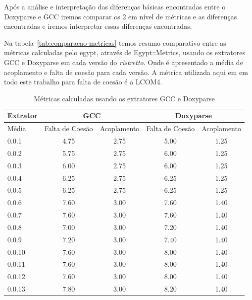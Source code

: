 Após a análise e interpretação das diferenças básicas encontradas entre o
Doxyparse e GCC iremos comparar os 2 em nível de métricas e as diferenças
encontradas e iremos interpretar essas diferenças encontradas.

Na tabela~\ref{tab:comparacao-metricas} temos resumo comparativo entre as
métricas calculadas pelo egypt, através de Egypt::Metrics, usando os extratores
GCC e Doxyparse em cada versão do {\it ristretto}. Onde é apresentado a média de
acoplamento e falta de coesão para cada versão. A métrica utilizada aqui em em
todo este trabalho para falta de coesão é a LCOM4.

\begin{table}
\caption{Métricas calculadas usando os extratores GCC e Doxyparse}
\centering
\begin{tabular}{| l | c c | c c |}
\hline
Extrator  & \multicolumn{2}{|c|}{GCC}        & \multicolumn{2}{|c|}{Doxyparse} \\
\hline
Média     & Falta de Coesão & Acoplamento    & Falta de Coesão & Acoplamento   \\
\hline
0.0.1     & 4.75            & 2.75           & 5.00            & 1.25          \\
0.0.2     & 5.75            & 2.75           & 6.00            & 1.25          \\
0.0.3     & 6.00            & 2.75           & 6.00            & 1.25          \\
0.0.4     & 6.25            & 2.75           & 6.25            & 1.25          \\
0.0.5     & 6.25            & 2.75           & 6.25            & 1.25          \\
0.0.6     & 7.60            & 3.00           & 7.60            & 1.40          \\
0.0.7     & 7.60            & 3.00           & 7.60            & 1.40          \\
0.0.8     & 7.00            & 3.00           & 7.20            & 1.40          \\
0.0.9     & 7.20            & 3.00           & 7.40            & 1.40          \\
0.0.10    & 7.60            & 3.00           & 8.00            & 1.40          \\
0.0.11    & 7.60            & 3.00           & 8.00            & 1.40          \\
0.0.12    & 7.60            & 3.00           & 8.00            & 1.40          \\
0.0.13    & 7.80            & 3.00           & 8.20            & 1.40          \\

\end{tabular}
\end{table}
